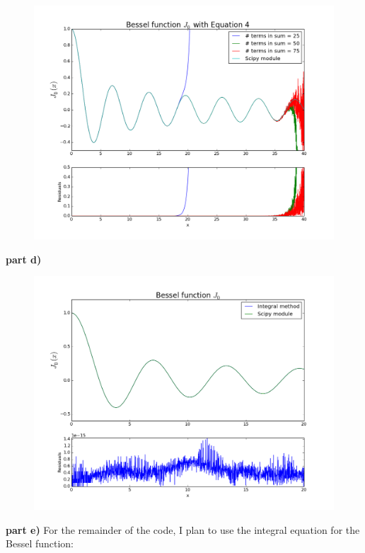 \begin{figure}[H]
\centering
\includegraphics[width = \linewidth]{indepq2c.png}
\caption{}
\label{fig:q2c}
\end{figure}

\textbf{part d)}

\begin{figure}[H]
\centering
\includegraphics[width = \linewidth]{indepq2d.png}
\caption{}
\label{fig:q2d}
\end{figure}

\textbf{part e)} For the remainder of the code, I plan to use the integral equation for the Bessel function:

